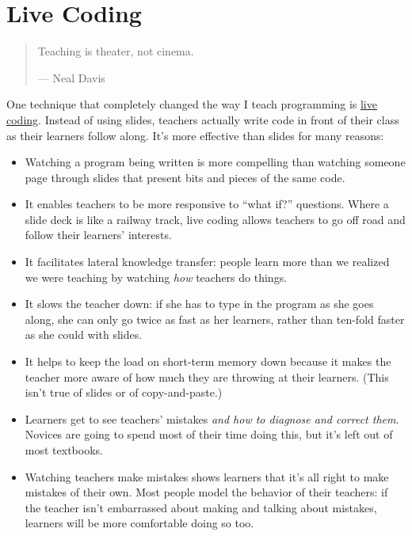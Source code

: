 \section{Live Coding}\label{s:performance-live}

\begin{quote}\setlength{\parindent}{0pt}
Teaching is theater, not cinema.

--- Neal Davis
\end{quote}

One technique that completely changed the way I teach programming is
\protect\hyperlink{g:live-coding}{live coding}. Instead of using slides,
teachers actually write code in front of their class as their learners
follow along. It's more effective than slides for many reasons:

\begin{itemize}
\item
  Watching a program being written is more compelling than watching
  someone page through slides that present bits and pieces of the same
  code.
\item
  It enables teachers to be more responsive to ``what if?'' questions.
  Where a slide deck is like a railway track, live coding allows
  teachers to go off road and follow their learners' interests.
\item
  It facilitates lateral knowledge transfer: people learn more than we
  realized we were teaching by watching \emph{how} teachers do things.
\item
  It slows the teacher down: if she has to type in the program as she
  goes along, she can only go twice as fast as her learners, rather
  than ten-fold faster as she could with slides.
\item
  It helps to keep the load on short-term memory down because it makes
  the teacher more aware of how much they are throwing at their
  learners. (This isn't true of slides or of copy-and-paste.)
\item
  Learners get to see teachers' mistakes \emph{and how to diagnose and
  correct them}. Novices are going to spend most of their time doing
  this, but it's left out of most textbooks.
\item
  Watching teachers make mistakes shows learners that it's all right
  to make mistakes of their own. Most people model the behavior of
  their teachers: if the teacher isn't embarrassed about making and
  talking about mistakes, learners will be more comfortable doing so
  too.
\end{itemize}

